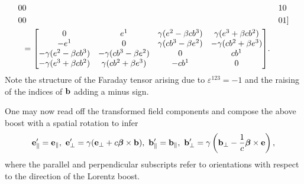 \begin{align*}
		0            & 0            & 1 & 0 \\
		0            & 0            & 0 & 1
	] \\
	  &=
	\mqty[
		0                             & e^{1}                         & \gamma(e^{2} - \beta cb^{3})  & \gamma(e^{3} + \beta cb^{2}) \\
		-e^{1}                        & 0                             & \gamma(cb^{3} - \beta e^{2})  & -\gamma(cb^{2} + \beta e^{3}) \\
		-\gamma(e^{2} - \beta cb^{3}) & -\gamma(cb^{3} - \beta e^{2}) & 0                             & cb^{1} \\
		-\gamma(e^{3} + \beta cb^{2}) & \gamma(cb^{2} + \beta e^{3})  & -cb^{1}                       & 0
	].
\end{align*}
Note the structure of the Faraday tensor arising due to $\varepsilon^{123} = -1$ and the raising of the indices of $\vb{b}$ adding a minus sign.

One may now read off the transformed field components and compose the above boost with a spatial rotation to infer
\begin{align*}
	\vb{e}_{\parallel}^{\prime} = \vb{e}_{\parallel},\ \vb{e}_{\perp}^{\prime} = \gamma(\vb{e}_{\perp} + c\vb*{\beta}\times\vb{b}),\ \vb{b}_{\parallel}^{\prime} = \vb{b}_{\parallel},\ \vb{b}_{\perp}^{\prime} = \gamma\left(\vb{b}_{\perp} - \frac{1}{c}\vb*{\beta}\times\vb{e}\right),
\end{align*}
where the parallel and perpendicular subscripts refer to orientations with respect to the direction of the Lorentz boost.

